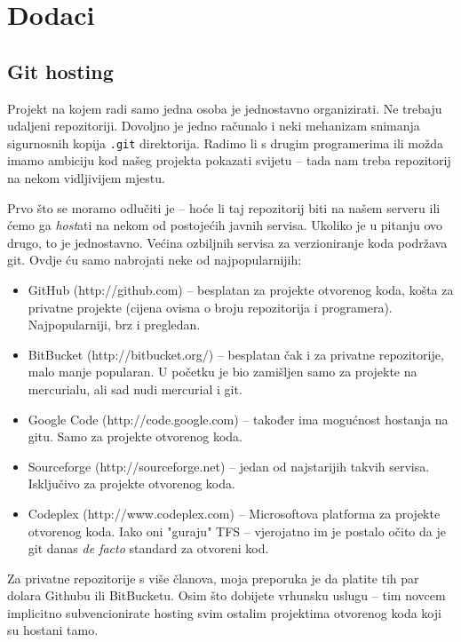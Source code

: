 \chapter*{Dodaci}

\section*{Git hosting}

Projekt na kojem radi samo jedna osoba je jednostavno organizirati. 
Ne trebaju udaljeni repozitoriji.
Dovoljno je jedno računalo i neki mehanizam snimanja sigurnosnih kopija \verb+.git+ direktorija.
Radimo li s drugim programerima ili možda imamo ambiciju kod našeg projekta pokazati svijetu -- tada nam treba repozitorij na nekom vidljivijem mjestu.

Prvo što se moramo odlučiti je -- hoće li taj repozitorij biti na našem serveru ili ćemo ga \emph{host}ati na nekom od postojećih javnih servisa.
Ukoliko je u pitanju ovo drugo, to je jednostavno.
Većina ozbiljnih servisa za verzioniranje koda podržava git.
Ovdje ću samo nabrojati neke od najpopularnijih:

\begin{itemize}
    \item GitHub (http://github.com) -- besplatan za projekte otvorenog koda, košta za privatne projekte (cijena ovisna o broju repozitorija i programera). Najpopularniji, brz i pregledan.
    \item BitBucket (http://bitbucket.org/) -- besplatan čak i za privatne repozitorije, malo manje popularan. U početku je bio zamišljen samo za projekte na mercurialu, ali sad nudi mercurial i git.
    \item Google Code (http://code.google.com) -- također ima mogućnost hostanja na gitu. Samo za projekte otvorenog koda.
    \item Sourceforge (http://sourceforge.net) -- jedan od najstarijih takvih servisa. Isključivo za projekte otvorenog koda.
    \item Codeplex (http://www.codeplex.com) -- Microsoftova platforma za projekte otvorenog koda. Iako oni "guraju" TFS -- vjerojatno im je postalo očito da je git danas \emph{de facto} standard za otvoreni kod.
\end{itemize}

Za privatne repozitorije s više članova, moja preporuka je da platite tih par dolara Githubu ili BitBucketu. 
Osim što dobijete vrhunsku uslugu -- tim novcem implicitno subvencionirate hosting svim ostalim projektima otvorenog koda koji su hostani tamo.

